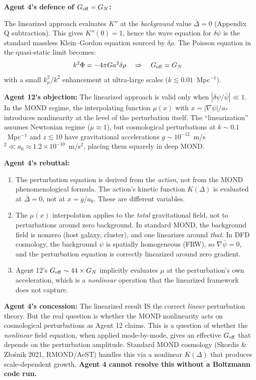 \documentclass[11pt]{article}
\newcommand{\ee}[1]{\times 10^{#1}}
\newcommand{\dpsi}{\delta\psi}
\newcommand{\Geff}{G_{\rm eff}}
\newcommand{\kmu}{k_\mu}
\newcommand{\azero}{a_0}
\theoremstyle{remark}
\begin{document}
\begin{crisisbox}[CRITICAL: The $\Geff$ Position]
\textbf{Agent 4's defence of $\Geff = G_N$:}

The linearized approach evaluates $K''$ at the \emph{background} value $\bar\Delta = 0$
(Appendix Q subtraction). This gives $K''(0) = 1$, hence the wave equation for $\dpsi$
is the standard massless Klein--Gordon equation sourced by $\delta\rho$. The Poisson
equation in the quasi-static limit becomes:
\[
  k^2 \Phi = -4\pi G a^2 \delta\rho \quad \Rightarrow \quad \Geff = G_N
\]
with a small $\kmu^2/k^2$ enhancement at ultra-large scales ($k \lesssim 0.01$~Mpc$^{-1}$).

\textbf{Agent 12's objection:} The linearized approach is valid only when
$|\dpsi/\bar\psi| \ll 1$. In the MOND regime, the interpolating function $\mu(x)$ with
$x = |\nabla\psi|/a_*$ introduces nonlinearity at the level of the perturbation itself.
The ``linearization'' assumes Newtonian regime ($\mu \approx 1$), but cosmological
perturbations at $k \sim 0.1$~Mpc$^{-1}$ and $z \lesssim 10$ have gravitational
accelerations $g \sim 10^{-12}$~m/s$^2 \ll \azero \approx 1.2\ee{-10}$~m/s$^2$, placing
them squarely in deep MOND.

\textbf{Agent 4's rebuttal:}
\begin{enumerate}
\item The perturbation equation is derived from the \emph{action}, not from the MOND
  phenomenological formula. The action's kinetic function $K(\Delta)$ is evaluated at
  $\bar\Delta = 0$, not at $x = g/\azero$. These are different variables.
\item The $\mu(x)$ interpolation applies to the \emph{total} gravitational field, not to
  perturbations around zero background. In standard MOND, the background field is
  nonzero (host galaxy, cluster), and one linearizes around \emph{that}. In DFD
  cosmology, the background $\psi$ is spatially homogeneous (FRW), so $\nabla\bar\psi = 0$,
  and the perturbation equation is correctly linearized around zero gradient.
\item Agent 12's $\Geff \sim 44 \times G_N$ implicitly evaluates $\mu$ at the
  perturbation's own acceleration, which is a \emph{nonlinear} operation that the
  linearized framework does not capture.
\end{enumerate}

\textbf{Agent 4's concession:} The linearized result IS the correct \emph{linear}
perturbation theory. But the real question is whether the MOND nonlinearity acts on
cosmological perturbations as Agent 12 claims. This is a question of whether the
\emph{nonlinear} field equation, when applied mode-by-mode, gives an effective $\Geff$
that depends on the perturbation amplitude. Standard MOND cosmology (Skordis \& Z{\l}o\'{s}nik
2021, RMOND/AeST) handles this via a nonlinear $K(\Delta)$ that produces scale-dependent
growth. \textbf{Agent 4 cannot resolve this without a Boltzmann code run.}


\end{crisisbox}
\end{document}
